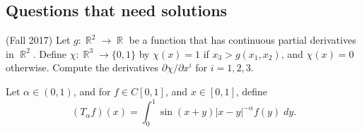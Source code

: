 \documentclass[answers]{exam}
\DeclareMathOperator{\RR}{\mathbb{R}}
\theoremstyle{problemstyle}
\newcommand{\1}[1]{\textbf{1}_{\left[#1\right]}} %
\begin{document}
\begin{questions}
\newpage
\section{Questions that need solutions}

\question (Fall 2017) Let $g: \RR^2 \to \RR$ be a function that has continuous partial derivatives in $\RR^2$. Define $\chi: \RR^3 \to \{ 0, 1 \}$ by $\chi(x) = 1$ if $x_3 > g(x_1,x_2)$, and $\chi(x) = 0$ otherwise. Compute the derivatives $\partial \chi / \partial x^i$ for $i = 1, 2, 3$.

\question Let $\alpha \in (0,1)$, and for $f \in C[0,1]$, and $x \in [0,1]$, define
%
\[ (T_\alpha f)(x) = \int_0^1 \sin(x+y) |x-y|^{-\alpha} f(y)\; dy. \]

\end{questions}
\end{document}
